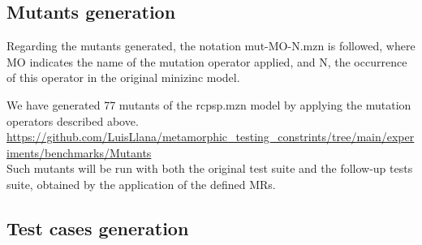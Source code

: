 \subsection{Mutants generation}
Regarding the mutants generated, the notation mut-MO-N.mzn is followed, where MO indicates the name of the mutation operator applied, and N, the occurrence of this operator in the original minizinc model.

We have generated 77 mutants of the rcpsp.mzn model by applying
the mutation operators described above. \url{ https://github.com/LuisLlana/metamorphic_testing_constrints/tree/main/experiments/benchmarks/Mutants}\\
Such mutants will be run with both the original test suite and the follow-up
tests suite, obtained by the application of the defined  MRs. 



\subsection{Test cases generation}










%




 
 






